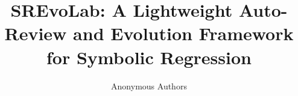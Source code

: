 \documentclass{article}
\title{SREvoLab: A Lightweight Auto-Review and Evolution Framework for Symbolic Regression}
\author{Anonymous Authors}
\date{}
\begin{document}
\maketitle

\begin{abstract}

\end{abstract}









\end{document}
